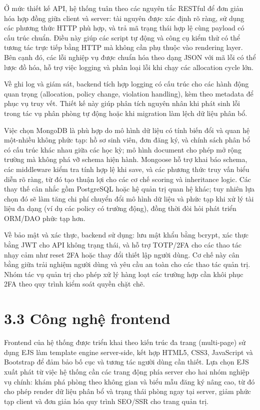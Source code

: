 \documentclass[a4paper,12pt,openany,oneside]{report}
\begin{document}
Ở mức thiết kế API, hệ thống tuân theo các nguyên tắc RESTful để đơn giản hóa hợp đồng giữa client và server: tài nguyên được xác định rõ ràng, sử dụng các phương thức HTTP phù hợp, và trả mã trạng thái hợp lệ cùng payload có cấu trúc chuẩn. Điều này giúp các script tự động và công cụ kiểm thử có thể tương tác trực tiếp bằng HTTP mà không cần phụ thuộc vào rendering layer. Bên cạnh đó, các lỗi nghiệp vụ được chuẩn hóa theo dạng JSON với mã lỗi có thể lược đồ hóa, hỗ trợ việc logging và phân loại lỗi khi chạy các allocation cycle lớn.

Về ghi log và giám sát, backend tích hợp logging có cấu trúc cho các hành động quan trọng (allocation, policy change, violation handling), kèm theo metadata để phục vụ truy vết. Thiết kế này giúp phân tích nguyên nhân khi phát sinh lỗi trong tác vụ phân phòng tự động hoặc khi migration làm lệch dữ liệu phân bổ.

Việc chọn MongoDB là phù hợp do mô hình dữ liệu có tính biến đổi và quan hệ một-nhiều không phức tạp: hồ sơ sinh viên, đơn đăng ký, và chính sách phân bổ có cấu trúc khác nhau giữa các học kỳ; mô hình document cho phép mở rộng trường mà không phá vỡ schema hiện hành. Mongoose hỗ trợ khai báo schema, các middleware kiểm tra tính hợp lệ khi save, và các phương thức truy vấn biểu diễn rõ ràng, từ đó tạo thuận lợi cho các cơ chế scoring và inheritance logic. Các thay thế cân nhắc gồm PostgreSQL hoặc hệ quản trị quan hệ khác; tuy nhiên lựa chọn đó sẽ làm tăng chi phí chuyển đổi mô hình dữ liệu và phức tạp khi xử lý tài liệu đa dạng (ví dụ các policy có trường động), đồng thời đòi hỏi phát triển ORM/DAO phức tạp hơn.

Về bảo mật và xác thực, backend sử dụng: lưu mật khẩu bằng bcrypt, xác thực bằng JWT cho API không trạng thái, và hỗ trợ TOTP/2FA cho các thao tác nhạy cảm như reset 2FA hoặc thay đổi thiết lập người dùng. Cơ chế này cân bằng giữa trải nghiệm người dùng và yêu cầu an toàn cho các thao tác quản trị. Nhóm tác vụ quản trị cho phép xử lý hàng loạt các trường hợp cần khôi phục 2FA theo quy trình kiểm soát quyền chặt chẽ.

\section*{3.3 Công nghệ frontend}
Frontend của hệ thống được triển khai theo kiến trúc đa trang (multi-page) sử dụng EJS làm template engine server-side, kết hợp HTML5, CSS3, JavaScript và Bootstrap để đảm bảo bố cục và tương tác người dùng cần thiết. Lựa chọn EJS xuất phát từ việc hệ thống cần các trang động phía server cho hai nhóm nghiệp vụ chính: khám phá phòng theo không gian và biểu mẫu đăng ký nâng cao, từ đó cho phép render dữ liệu phân bổ và trạng thái phòng ngay tại server, giảm phức tạp client và đơn giản hóa quy trình SEO/SSR cho trang quản trị.
\end{document}
